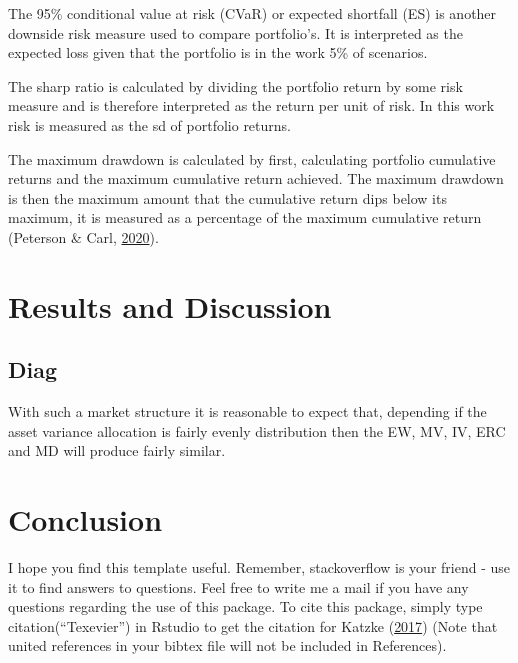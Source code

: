\documentclass[11pt,preprint, authoryear]{elsarticle}
\numberwithin{equation}{section}
\numberwithin{figure}{section}
\numberwithin{table}{section}
\begin{document}
The 95\% conditional value at risk (CVaR) or expected shortfall (ES) is
another downside risk measure used to compare portfolio's. It is
interpreted as the expected loss given that the portfolio is in the work
5\% of scenarios.

The sharp ratio is calculated by dividing the portfolio return by some
risk measure and is therefore interpreted as the return per unit of
risk. In this work risk is measured as the sd of portfolio returns.

The maximum drawdown is calculated by first, calculating portfolio
cumulative returns and the maximum cumulative return achieved. The
maximum drawdown is then the maximum amount that the cumulative return
dips below its maximum, it is measured as a percentage of the maximum
cumulative return (Peterson \& Carl,
\protect\hyperlink{ref-PerformanceAnalytics}{2020}).

\hypertarget{results-and-discussion}{%
\section{\texorpdfstring{Results and Discussion
\label{reasults}}{Results and Discussion }}\label{results-and-discussion}}

\hypertarget{diag}{%
\subsection{Diag}\label{diag}}

With such a market structure it is reasonable to expect that, depending
if the asset variance allocation is fairly evenly distribution then the
EW, MV, IV, ERC and MD will produce fairly similar.

\hypertarget{conclusion}{%
\section{\texorpdfstring{Conclusion
\label{conclusion}}{Conclusion }}\label{conclusion}}

I hope you find this template useful. Remember, stackoverflow is your
friend - use it to find answers to questions. Feel free to write me a
mail if you have any questions regarding the use of this package. To
cite this package, simply type citation(``Texevier'') in Rstudio to get
the citation for Katzke (\protect\hyperlink{ref-Texevier}{2017}) (Note
that united references in your bibtex file will not be included in
References).

\newpage
\end{document}
